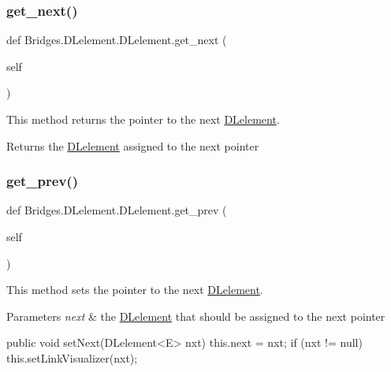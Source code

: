 \subsubsection{\texorpdfstring{get\+\_\+next()}{get\_next()}}
{\footnotesize\ttfamily def Bridges.\+D\+Lelement.\+D\+Lelement.\+get\+\_\+next (\begin{DoxyParamCaption}\item[{}]{self }\end{DoxyParamCaption})}



This method returns the pointer to the next \mbox{\hyperlink{class_bridges_1_1_d_lelement_1_1_d_lelement}{D\+Lelement}}. 

\begin{DoxyReturn}{Returns}
the \mbox{\hyperlink{class_bridges_1_1_d_lelement_1_1_d_lelement}{D\+Lelement}} assigned to the next pointer 
\end{DoxyReturn}
\mbox{\label{class_bridges_1_1_d_lelement_1_1_d_lelement_a012742f29626676f4e99d1f54e9dd10d}} 
\subsubsection{\texorpdfstring{get\+\_\+prev()}{get\_prev()}}
{\footnotesize\ttfamily def Bridges.\+D\+Lelement.\+D\+Lelement.\+get\+\_\+prev (\begin{DoxyParamCaption}\item[{}]{self }\end{DoxyParamCaption})}



This method sets the pointer to the next \mbox{\hyperlink{class_bridges_1_1_d_lelement_1_1_d_lelement}{D\+Lelement}}. 


\begin{DoxyParams}{Parameters}
{\em next} & the \mbox{\hyperlink{class_bridges_1_1_d_lelement_1_1_d_lelement}{D\+Lelement}} that should be assigned to the next pointer\\
\hline
\end{DoxyParams}
\begin{DoxyVerb}    public void setNext(DLelement<E> nxt) {
        this.next = nxt;
        if (nxt != null)
            this.setLinkVisualizer(nxt);
    }
\end{DoxyVerb}


